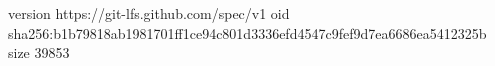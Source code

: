version https://git-lfs.github.com/spec/v1
oid sha256:b1b79818ab1981701ff1ce94c801d3336efd4547c9fef9d7ea6686ea5412325b
size 39853
